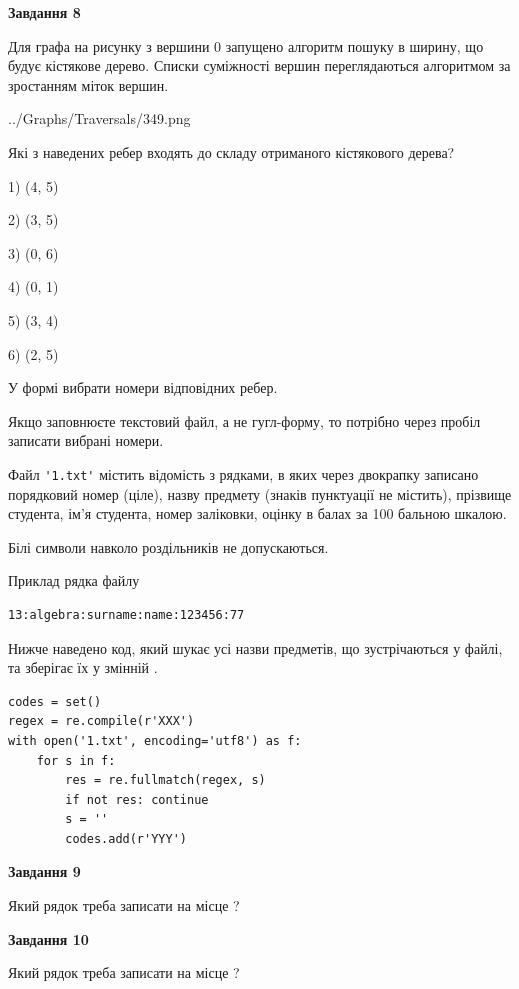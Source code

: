 \documentclass[12pt, ukrainian]{article}
\def\code#1{\Verb!#1!}
\begin{document}
{\begin {large}
{\begin {center}\textbf{Завдання 8}\end {center}}\par
Для графа на рисунку з вершини 0 запущено алгоритм пошуку в ширину, що будує кістякове дерево. Списки суміжності вершин переглядаються алгоритмом за зростанням міток вершин.\par
\begin{center}
	{../Graphs/Traversals/349.png}
\end{center}
\par Які з наведених ребер входять до складу отриманого кістякового дерева?\par
1) (4, 5)\par
2) (3, 5)\par
3) (0, 6)\par
4) (0, 1)\par
5) (3, 4)\par
6) (2, 5)\par
{\vskip 15pt} У формі вибрати номери відповідних ребер.


Якщо заповнюєте текстовий файл, а не гугл-форму, то потрібно через пробіл записа\-ти вибрані номери.\par
\newpage


Файл \code{'1.txt'} містить відомість з рядками, в яких через двокрапку записано поряд\-ковий номер (ціле), назву предмету (знаків пунктуації не містить), прізвище студента, ім'я студента, номер заліковки, оцінку в балах за 100 бальною шкалою.

Білі символи навколо роздільників не допускаються.

Приклад рядка файлу



\begin{verbatim}
13:algebra:surname:name:123456:77
\end{verbatim}


Нижче наведено код, який шукає усі назви предметів, що зустрічаються у файлі, та зберігає їх у змінній .



\begin{verbatim}
codes = set()
regex = re.compile(r'XXX')
with open('1.txt', encoding='utf8') as f:
    for s in f:
        res = re.fullmatch(regex, s)
        if not res: continue
        s = ''
        codes.add(r'YYY')
\end{verbatim}


{\begin {center}\textbf{Завдання 9}\end {center}}\par
Який рядок треба записати на місце  ?\par
\vspace{5mm}


{\begin {center}\textbf{Завдання 10}\end {center}}\par
Який рядок треба записати на місце  ?\par


\newpage


\end {large}}
\end{document}
